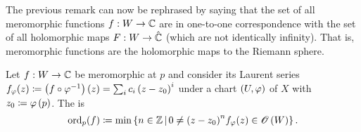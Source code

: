 \documentclass[../Moduli_Spaces_of_Riemann_Surfaces.tex]{subfiles}
\begin{document}
    \begin{remark}
        The previous remark can now be rephrased by saying that the set of all meromorphic functions $f:W\to\mathbb{C}$ are in one-to-one correspondence with the set of all holomorphic maps $F:W\to\hat{\mathbb{C}}$ (which are not identically infinity). That is, meromorphic functions are the holomorphic maps to the Riemann sphere.\exqed
    \end{remark}
    \begin{definition}\label{1.2:def:order}
        Let $f:W\to\mathbb{C}$ be meromorphic at $p$ and consider its Laurent series $f_\varphi\!\left(z\right)\coloneqq\left(f\circ\varphi^{-1}\right)\left(z\right)=\sum_{i}c_i\left(z-z_0\right)^i$ under a chart $\left(U,\varphi\right)$ of $X$ with $z_0\coloneqq\varphi\left(p\right)$. The  is
        \begin{equation*}
            \operatorname{ord}_p\!\left(f\right)\coloneqq\operatorname{min}\left\{n\in\mathbb{Z}\,\middle\vert\,0\neq\left(z-z_0\right)^n\!f_\varphi\!\left(z\right)\in\mathscr{O}\left(W\right)\right\}.
        \end{equation*}
    \end{definition}
    \vspace{-0.05in}
\end{document}
